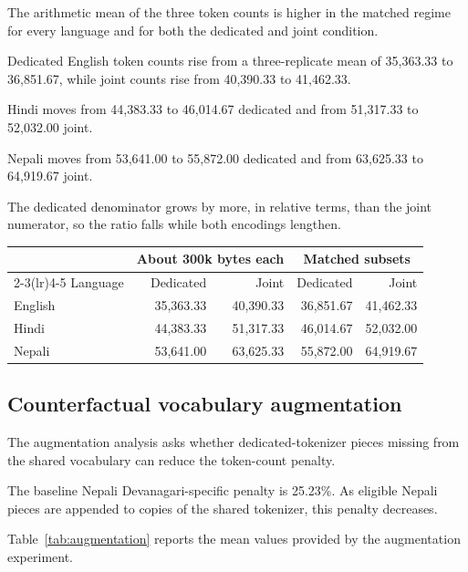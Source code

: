 \documentclass[10pt,twocolumn]{article}
\begin{document}
The arithmetic mean of the three token counts is higher
in the matched regime for every language and for both
the dedicated and joint condition.

Dedicated English token counts rise from a three-replicate
mean of 35,363.33 to 36,851.67, while joint counts rise
from 40,390.33 to 41,462.33.

Hindi moves from 44,383.33 to 46,014.67 dedicated and
from 51,317.33 to 52,032.00 joint.

Nepali moves from 53,641.00 to 55,872.00 dedicated
and from 63,625.33 to 64,919.67 joint.

The dedicated denominator grows by more, in relative
terms, than the joint numerator, so the ratio falls
while both encodings lengthen.

\begin{center}
\footnotesize
\setlength{\tabcolsep}{3pt}
\begin{tabular}{@{}lrrrr@{}}
\toprule
 & \multicolumn{2}{c}{About 300k bytes each}
 & \multicolumn{2}{c}{Matched subsets} \\
\cmidrule(lr){2-3}\cmidrule(lr){4-5}
Language & Dedicated & Joint & Dedicated & Joint \\
\midrule
English & 35,363.33 & 40,390.33 & 36,851.67 & 41,462.33 \\
Hindi & 44,383.33 & 51,317.33 & 46,014.67 & 52,032.00 \\
Nepali & 53,641.00 & 63,625.33 & 55,872.00 & 64,919.67 \\
\bottomrule
\end{tabular}

\label{tab:absolute}
\end{center}

\subsection{Counterfactual vocabulary augmentation}

The augmentation analysis asks whether dedicated-tokenizer
pieces missing from the shared vocabulary can reduce
the token-count penalty.

The baseline Nepali Devanagari-specific penalty is
25.23\%. As eligible Nepali pieces are appended to copies
of the shared tokenizer, this penalty decreases.

Table~\ref{tab:augmentation} reports the mean values
provided by the augmentation experiment.
\end{document}
